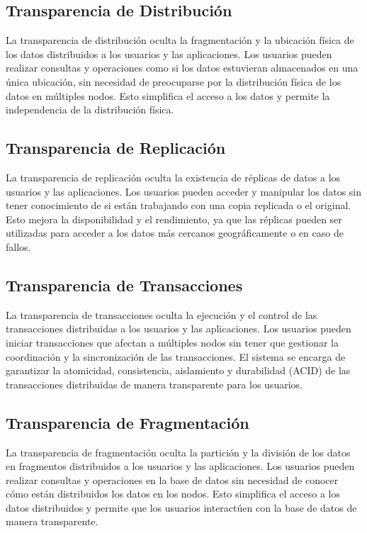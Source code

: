 \subsection{Transparencia de Distribución}
\noindent
La transparencia de distribución oculta la fragmentación y la ubicación física de los datos distribuidos a los usuarios y las aplicaciones. Los usuarios pueden realizar consultas y operaciones como si los datos estuvieran almacenados en una única ubicación, sin necesidad de preocuparse por la distribución física de los datos en múltiples nodos. Esto simplifica el acceso a los datos y permite la independencia de la distribución física.

\subsection{Transparencia de Replicación}
\noindent
La transparencia de replicación oculta la existencia de réplicas de datos a los usuarios y las aplicaciones. Los usuarios pueden acceder y manipular los datos sin tener conocimiento de si están trabajando con una copia replicada o el original. Esto mejora la disponibilidad y el rendimiento, ya que las réplicas pueden ser utilizadas para acceder a los datos más cercanos geográficamente o en caso de fallos.

\subsection{Transparencia de Transacciones}
\noindent
La transparencia de transacciones oculta la ejecución y el control de las transacciones distribuidas a los usuarios y las aplicaciones. Los usuarios pueden iniciar transacciones que afectan a múltiples nodos sin tener que gestionar la coordinación y la sincronización de las transacciones. El sistema se encarga de garantizar la atomicidad, consistencia, aislamiento y durabilidad (ACID) de las transacciones distribuidas de manera transparente para los usuarios.

\subsection{Transparencia de Fragmentación}
\noindent
La transparencia de fragmentación oculta la partición y la división de los datos en fragmentos distribuidos a los usuarios y las aplicaciones. Los usuarios pueden realizar consultas y operaciones en la base de datos sin necesidad de conocer cómo están distribuidos los datos en los nodos. Esto simplifica el acceso a los datos distribuidos y permite que los usuarios interactúen con la base de datos de manera transparente.

